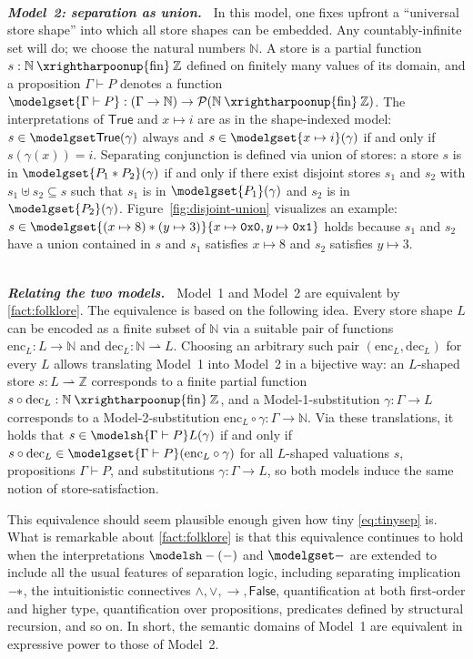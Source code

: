 \documentclass[
  sigconf,
  screen, ]{acmart}
\theoremstyle{definition}
\newcommand\calP{\mathcal P}
\newcommand\N{\mathbb N}
\newcommand\Z{\mathbb Z}
\newcommand\goodparagraph[1]{\hspace{0em}\\[-0.5em]\textbf{\textit{#1.~}}}
\newcommand\trueprop{\mathsf{True}}
\newcommand\falseprop{\mathsf{False}}
\newcommand\hexnum[1]{\texttt{0x#1}}
\newcommand\enc{\mathrm{enc}}
\newcommand\dec{\mathrm{dec}}
\newcommand\nomstore{\mathbin{\xrightharpoonup{\rm fin}}}
\newcommand\sepcon{\mathbin{*}}
\newcommand\sepimp{\mathbin{-\mkern-2mu*}}
\begin{document}
\goodparagraph{Model~2: separation as union}
In this model, one fixes upfront
a ``universal store shape''
into which all store shapes can be embedded.
Any countably-infinite set will do;
we choose the natural numbers $\N$.
A store is a partial
function $s : \N\nomstore\Z$
defined on finitely many values of its domain,
and a proposition $\Gamma\vdash P$
denotes a function
$\modelgset{\Gamma\vdash P} : (\Gamma\to\N)\to\calP(\N\nomstore\Z)$.
The interpretations of $\trueprop$ and $x\mapsto i$
are as in the shape-indexed model:
$s\in \modelgset\trueprop(\gamma)$
always and $s\in\modelgset{x\mapsto i}(\gamma)$
if and only if $s(\gamma(x)) = i$.
Separating conjunction is defined via union
of stores: a store $s$ is in $\modelgset{P_1\sepcon P_2}(\gamma)$ 
if and only if there exist disjoint stores $s_1$ and $s_2$ 
with $s_1 \uplus s_2 \subseteq s$ such that
$s_1$ is in $\modelgset{P_1}(\gamma)$
and $s_2$ is in $\modelgset{P_2}(\gamma)$.
Figure~\ref{fig:disjoint-union} visualizes an example:
$s\in\modelgset{(x\mapsto 8)\sepcon(y\mapsto 3)}\{x\mapsto \hexnum0,y\mapsto \hexnum1\}$
holds because $s_1$ and $s_2$
have a union contained in $s$
and $s_1$ satisfies $x \mapsto 8$
and $s_2$ satisfies $y \mapsto 3$.

\goodparagraph{Relating the two models}
Model~1 and Model~2 are equivalent by
\cref{fact:folklore}.
The equivalence is based on the following idea.
Every store shape $L$ can be 
encoded as a finite subset of $\N$
via a suitable pair of functions
$\enc_L: L\to\N$
and 
$\dec_L : \N\rightharpoonup L$.
Choosing an arbitrary such pair $(\enc_L,\dec_L)$ for every $L$
allows translating Model~1 into Model~2
in a bijective way:
an $L$-shaped store $s : L\rightharpoonup \Z$
corresponds to a finite partial function $s\circ \dec_L : \N\nomstore\Z$,
and a Model-1-substitution $\gamma : \Gamma\to L$
corresponds to a Model-2-substitution $\enc_L \circ \gamma : \Gamma\to \N$.
Via these translations, it holds that
 $s\in \modelsh{\Gamma\vdash P}L(\gamma)$ if and only if 
$s\circ\dec_L\in \modelgset{\Gamma\vdash P}(\enc_L\circ \gamma)$
for all $L$-shaped valuations $s$, propositions $\Gamma\vdash P$,
and substitutions $\gamma : \Gamma\to L$,
so both models induce the same notion of store-satisfaction.

This equivalence should seem plausible enough
given how tiny \ref{eq:tinysep} is.
What is remarkable about \cref{fact:folklore} is that this equivalence
continues to hold
when the interpretations $\modelsh-{(-)}$ and $\modelgset-$
are extended
to include all the usual features of separation logic,
including separating implication $\sepimp$,
the intuitionistic connectives $\land,\lor,\to,\falseprop$,
quantification
at both first-order and higher type, quantification over propositions,
predicates defined by structural recursion, and so on.
In short, the semantic domains of Model~1 are equivalent in expressive power
to those of Model~2.
\end{document}
